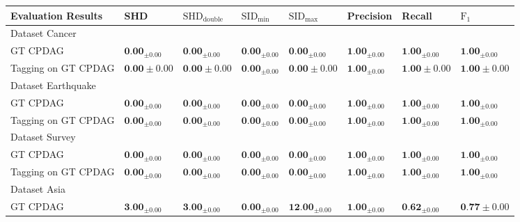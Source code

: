 \documentclass[10pt]{article}
\begin{document}
\begin{table}[h]
\begin{center}
\begin{tabular}{|l|l|l|l|l|l|l|l|}
\hline
Evaluation Results & SHD & $\mathrm{SHD}_{\text {double }}$ & $\mathrm{SID}_{\text {min }}$ & $\mathrm{SID}_{\text {max }}$ & Precision & Recall & $\mathrm{F}_{1}$ \\
\hline
Dataset Cancer &  &  &  &  &  &  &  \\
\hline
GT CPDAG & $\mathbf{0 . 0 0}_{ \pm 0.00}$ & $\mathbf{0 . 0 0}_{ \pm 0.00}$ & $\mathbf{0 . 0 0}_{ \pm 0.00}$ & $\mathbf{0 . 0 0}_{ \pm 0.00}$ & $\mathbf{1 . 0 0}_{ \pm 0.00}$ & $\mathbf{1 . 0 0}_{ \pm 0.00}$ & $\mathbf{1 . 0 0}_{ \pm 0.00}$ \\
\hline
Tagging on GT CPDAG & $\mathbf{0 . 0 0} \pm 0.00$ & $\mathbf{0 . 0 0} \pm 0.00$ & $\mathbf{0 . 0 0}_{ \pm 0.00}$ & $\mathbf{0 . 0 0} \pm 0.00$ & $\mathbf{1 . 0 0}_{ \pm 0.00}$ & $\mathbf{1 . 0 0} \pm 0.00$ & $\mathbf{1 . 0 0} \pm 0.00$ \\
\hline
Dataset Earthquake & \multicolumn{7}{|c|}{} \\
\hline
GT CPDAG & $\mathbf{0 . 0 0}_{ \pm 0.00}$ & $\mathbf{0 . 0 0}_{ \pm 0.00}$ & $\mathbf{0 . 0 0}_{ \pm 0.00}$ & $\mathbf{0 . 0 0}_{ \pm 0.00}$ & $\mathbf{1 . 0 0}_{ \pm 0.00}$ & $\mathbf{1 . 0 0}_{ \pm 0.00}$ & $\mathbf{1 . 0 0}_{ \pm 0.00}$ \\
\hline
Tagging on GT CPDAG & $\mathbf{0 . 0 0}_{ \pm 0.00}$ & $\mathbf{0 . 0 0}_{ \pm 0.00}$ & $\mathbf{0 . 0 0}_{ \pm 0.00}$ & $\mathbf{0 . 0 0}_{ \pm 0.00}$ & $\mathbf{1 . 0 0}_{ \pm 0.00}$ & $\mathbf{1 . 0 0}_{ \pm 0.00}$ & $\mathbf{1 . 0 0}_{ \pm 0.00}$ \\
\hline
Dataset Survey & \multicolumn{7}{|c|}{} \\
\hline
GT CPDAG & $\mathbf{0 . 0 0}_{ \pm 0.00}$ & $\mathbf{0 . 0 0}_{ \pm 0.00}$ & $\mathbf{0 . 0 0}_{ \pm 0.00}$ & $\mathbf{0 . 0 0}_{ \pm 0.00}$ & $\mathbf{1 . 0 0}_{ \pm 0.00}$ & $\mathbf{1 . 0 0}_{ \pm 0.00}$ & $\mathbf{1 . 0 0}_{ \pm 0.00}$ \\
\hline
Tagging on GT CPDAG & $\mathbf{0 . 0 0}_{ \pm 0.00}$ & $\mathbf{0 . 0 0}_{ \pm 0.00}$ & $\mathbf{0 . 0 0}_{ \pm 0.00}$ & $\mathbf{0 . 0 0}_{ \pm 0.00}$ & $\mathbf{1 . 0 0}_{ \pm 0.00}$ & $\mathbf{1 . 0 0}_{ \pm 0.00}$ & $\mathbf{1 . 0 0}_{ \pm 0.00}$ \\
\hline
Dataset Asia & \multicolumn{7}{|c|}{} \\
\hline
GT CPDAG & $\mathbf{3 . 0 0}_{ \pm 0.00}$ & $\mathbf{3 . 0 0}_{ \pm 0.00}$ & $\mathbf{0 . 0 0}_{ \pm 0.00}$ & $\mathbf{1 2 . 0 0}_{ \pm 0.00}$ & $\mathbf{1 . 0 0}_{ \pm 0.00}$ & $\mathbf{0 . 6 2}_{ \pm 0.00}$ & $\mathbf{0 . 7 7} \pm 0.00$ \\

\end{tabular}
\end{center}
\end{table}
\end{document}
